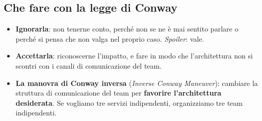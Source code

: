 \subsection{Che fare con la legge di Conway}

\begin{itemize}
  \item \textbf{Ignorarla}: non tenerne conto, perché non se ne è mai sentito parlare o perché si pensa che non valga nel
        proprio caso. \textit{Spoiler}: vale.
  \item \textbf{Accettarla}: riconoscerne l'impatto, e fare in modo che l'architettura non si scontri con i canali di
        comunicazione del team.
  \item \textbf{La manovra di Conway inversa} (\textit{Inverse Conway Maneuver}): cambiare la struttura di comunicazione del
        team per \textbf{favorire l'architettura desiderata}. Se vogliamo tre servizi indipendenti, organizziamo tre team
        indipendenti.
\end{itemize}


